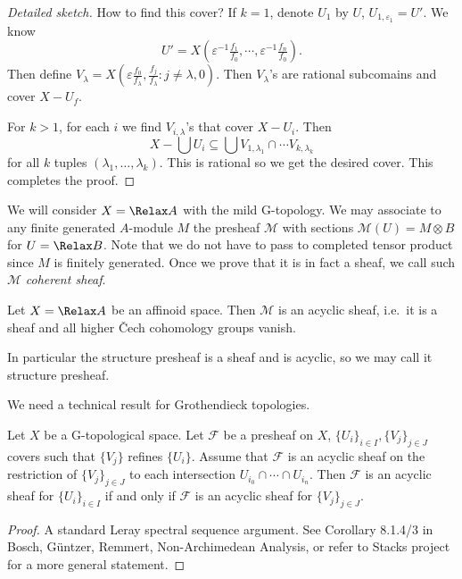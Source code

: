 \documentclass[a4paper]{article}
\newcommand{\sh}[1]{\mathcal{#1}} %
\let\Sp\Relax
\DeclareMathOperator{\Sp}{Sp} %
\begin{document}
\begin{proof}[Detailed sketch]
  How to find this cover? If \(k = 1\), denote \(U_1\) by \(U\), \(U_{1, \varepsilon_1} = U'\). We know
  \[
    U' = X(\varepsilon^{-1}\tfrac{f_1}{f_0}, \cdots, \varepsilon^{-1}\tfrac{f_n}{f_0}).
  \]
  Then define \(V_\lambda = X(\varepsilon \tfrac{f_0}{f_\lambda}, \tfrac{f_j}{f_\lambda}: j \ne \lambda, 0)\). Then \(V_\lambda\)'s are rational subcomains and cover \(X - U_f\).

  For \(k > 1\), for each \(i\) we find \(V_{i, \lambda}\)'s that cover \(X - U_i\). Then
  \[
    X - \bigcup U_i \subseteq \bigcup V_{1, \lambda_1} \cap \cdots V_{k, \lambda_k}
  \]
  for all \(k\) tuples \((\lambda_1, \dots, \lambda_k)\). This is rational so we get the desired cover. This completes the proof.
\end{proof}

We will consider \(X = \Sp A\) with the mild G-topology. We may associate to any finite generated \(A\)-module \(M\) the presheaf \(\sh M\) with sections \(\sh M(U) = M \otimes B\) for \(U = \Sp B\). Note that we do not have to pass to completed tensor product since \(M\) is finitely generated. Once we prove that it is in fact a sheaf, we call such \(\sh M\) \emph{coherent sheaf}.

\begin{theorem}
  \label{thm:Tate's acyclicity theorem}
  Let \(X = \Sp A\) be an affinoid space. Then \(\sh M\) is an acyclic sheaf, i.e.\ it is a sheaf and all higher Čech cohomology groups vanish.
\end{theorem}

In particular the structure presheaf is a sheaf and is acyclic, so we may call it structure presheaf.

We need a technical result for Grothendieck topologies.

\begin{lemma}[reduction]
  Let \(X\) be a G-topological space. Let \(\sh F\) be a presheaf on \(X\), \(\{U_i\}_{i \in I}, \{V_j\}_{j \in J}\) covers such that \(\{V_j\}\) refines \(\{U_i\}\). Assume that \(\sh F\) is an acyclic sheaf on the restriction of \(\{V_j\}_{j \in J}\) to each intersection \(U_{i_0} \cap \cdots \cap U_{i_n}\). Then \(\sh F\) is an acyclic sheaf for \(\{U_i\}_{i \in I}\) if and only if \(\sh F\) is an acyclic sheaf for \(\{V_j\}_{j \in J}\).
\end{lemma}

\begin{proof}
  A standard Leray spectral sequence argument. See Corollary 8.1.4/3 in Bosch, Güntzer, Remmert, Non-Archimedean Analysis, or refer to Stacks project for a more general statement.
\end{proof}
\end{document}
